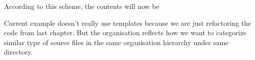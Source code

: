 \documentclass[12pt]{book}
\begin{document}
According to this scheme, the contents will now be\\
\vspace{0.6cm}
\vspace{0.6cm}
\vspace{0.6cm}
\vspace{0.6cm}

Current example doesn't really use templates because we are just refactoring the code from last chapter. But the organisation reflects how we want to categorize similar type of source files in the same organisation hierarchy under same directory.


\end{document}
